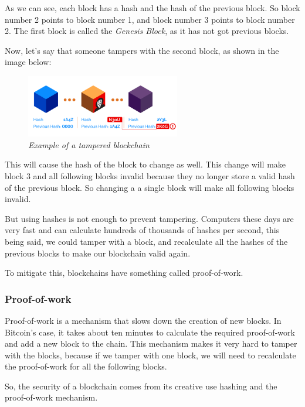 \documentclass{article}
\newcommand\tab[1][1cm]{\hspace*{#1}}
\begin{document}
As we can see, each block has a hash and the hash of the previous block. So block number 2 points to block number 1, and block number 3 points to block number 2. The first block is called the \textit{Genesis Block}, as it has not got previous blocks.

Now, let's say that someone tampers with the second block, as shown in the image below:

\begin{figure}[H]
    \begin{center}
        \includegraphics[width=0.6\textwidth]{images/invalid_hash.png}
        \caption{\textit{Example of a tampered blockchain}}
    \end{center}
\end{figure}

This will cause the hash of the block to change as well. This change will make block 3 and all following blocks invalid because they no longer store a valid hash of the previous block. So changing a a single block will make all following blocks invalid.

But using hashes is not enough to prevent tampering. Computers these days are very fast and can calculate hundreds of thousands of hashes per second, this being said, we could tamper with a block, and recalculate all the hashes of the previous blocks to make our blockchain valid again.

To mitigate this, blockchains have something called proof-of-work.

\subsubsection{Proof-of-work}

\tab Proof-of-work is a mechanism that slows down the creation of new blocks. In Bitcoin's case, it takes about ten minutes to calculate the required proof-of-work and add a new block to the chain. This mechanism makes it very hard to tamper with the blocks, because if we tamper with one block, we will need to recalculate the proof-of-work for all the following blocks.

So, the security of a blockchain comes from its creative use hashing and the proof-of-work mechanism.
\end{document}
